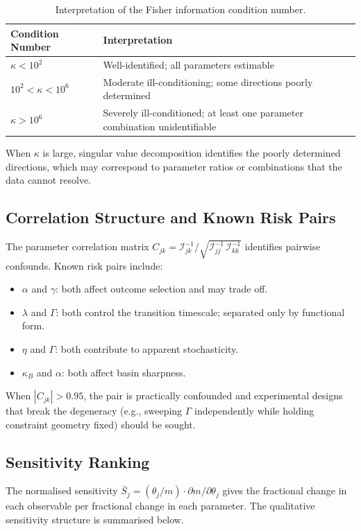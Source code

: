 \documentclass[12pt]{article}
\begin{document}
\begin{table}[ht]
\centering
\caption{Interpretation of the Fisher information condition number.}
\begin{tabular}{@{}ll@{}}
\toprule
Condition Number & Interpretation \\
\midrule
$\kappa < 10^2$ & Well-identified; all parameters estimable \\
$10^2 < \kappa < 10^6$ & Moderate ill-conditioning; some directions poorly determined \\
$\kappa > 10^6$ & Severely ill-conditioned; at least one parameter combination unidentifiable \\
\bottomrule
\end{tabular}
\end{table}

When $\kappa$ is large, singular value decomposition identifies the poorly determined directions, which may correspond to parameter ratios or combinations that the data cannot resolve.

\subsection{Correlation Structure and Known Risk Pairs}

The parameter correlation matrix $C_{jk} = \mathcal{I}^{-1}_{jk} / \sqrt{\mathcal{I}^{-1}_{jj}\,\mathcal{I}^{-1}_{kk}}$ identifies pairwise confounds. Known risk pairs include:
\begin{itemize}
    \item $\alpha$ and $\gamma$: both affect outcome selection and may trade off.
    \item $\lambda$ and $\Gamma$: both control the transition timescale; separated only by functional form.
    \item $\eta$ and $\Gamma$: both contribute to apparent stochasticity.
    \item $\kappa_B$ and $\alpha$: both affect basin sharpness.
\end{itemize}
When $|C_{jk}| > 0.95$, the pair is practically confounded and experimental designs that break the degeneracy (e.g., sweeping $\Gamma$ independently while holding constraint geometry fixed) should be sought.

\subsection{Sensitivity Ranking}

The normalised sensitivity $\bar{S}_j = (\theta_j / m) \cdot \partial m / \partial \theta_j$ gives the fractional change in each observable per fractional change in each parameter. The qualitative sensitivity structure is summarised below.
\end{document}
